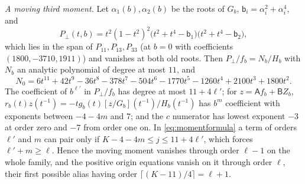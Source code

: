 \documentclass{amsart}
\theoremstyle{definition}
\theoremstyle{remark}
\numberwithin{equation}{section}
\begin{document}
\emph{A moving third moment.} Let $\alpha_1(b),\alpha_2(b)$ be the roots of $G_b$,
$\mathsf b_i=\alpha_i^2+\alpha_i^4$, and
\[
  P_\perp(t,b)=t^2(1-t^2)^2\bigl(t^2+t^4-\mathsf b_1\bigr)\bigl(t^2+t^4-\mathsf b_2\bigr),
\]
which lies in the span of $P_{11},P_{13},P_{33}$ (at $b=0$ with coefficients
$(1800,-3710,1911)$) and vanishes at both old roots. Then
$P_\perp/f_b=N_b/H_b$ with $N_b$ an analytic polynomial of degree at most $11$, and
\[
  N_0=6t^{11}+42t^9-36t^8-378t^7-504t^6-1770t^5-1260t^4+2100t^3+1800t^2 .
\]
The coefficient of $b^{\ell'}$ in $P_\perp/f_b$ has degree at most $11+4\ell'$; for
$z=\mathsf Af_b+\mathsf BZ_b$,
$r_b(t)z(t^{-1})=-tg_b(t)[z/G_b](t^{-1})/H_b(t^{-1})$ has $b^{m}$ coefficient with
exponents between $-4-4m$ and $7$; and the $c$ numerator has lowest exponent $-3$ at
order zero and $-7$ from order one on. In \eqref{eq:momentformula} a term of orders
$\ell'$ and $m$ can pair only if $K-4-4m\le j\le11+4\ell'$, which forces
$\ell'+m\ge\ell$. Hence the moving moment vanishes through order $\ell-1$ on the whole
family, and the positive origin equations vanish on it through order $\ell$, their
first possible alias having order $\lceil(K-11)/4\rceil=\ell+1$.
\end{document}
